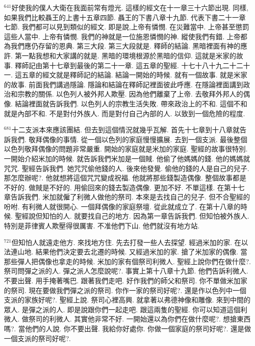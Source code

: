 \documentclass{book}
\begin{document}
$^{641}$好使我的僕人大衛在我面前常有燈光.
這樣的經文在十一章三十六節出現.
同樣,如果我們比較聶王的上書十五章四節.
聶王的下書八章十九節.
代表下書二十一章七節.
我們都可以見到類似的經文.
即是說,上帝有憐憫.
在災難當中.
上帝甚至懲罰這些人當中.
上帝有憐憫.
我們的神就是一位施恩憐憫的神.
縱使我們有錯.
上帝都為我們應仍存留的恩典.
第三大段.
第三大段就是.
釋師的結論.
黑暗裡面有神的應許.
第一點我想和大家講的就是.
黑暗的環境根源於黑暗的信仰.
這就是米家的故事.
釋師記由第十七章到最後的第二十一章.
這五章的聖經.
十七十八十九二十二十一.
這五章的經文就是釋師記的結論.
結論一開始的時候.
就有一個故事.
就是米家的故事.
前面我們講過隱論.
隱論和結論在釋師記裡面彼此呼應.
在隱論裡面講到政治和宗教的關係.
以色列人被外邦人欺壓.
因為他們離棄了上帝.
去敬拜外邦人的偶像.
結論裡面就告訴我們.
以色列人的宗教生活失敗.
帶來政治上的不和.
這個不和就是內部不和.
不是對付外族人.
而是對付自己內部的人.
以致到一個危險的程度.

$^{681}$十二支派本來應該團結.
但去到這個情況就幾乎瓦解.
首先十七章到十八章就告訴我們.
敬拜偶像的事情.
從一個以色列的家庭慢慢擴展.
去到一個支派.
最後整個以色列敬拜偶像的問題非常嚴重.
開始的家庭就是米加的家庭.
聖經的故事很特別.
一開始介紹米加的時候.
就告訴我們米加是一個賊.
他偷了他媽媽的錢.
他的媽媽就咒咒.
聖經告訴我們.
她咒咒偷他錢的人.
後來他發覺.
偷他的錢的人是自己的兒子.
那怎麼辦呢?.
他就想將這個咒咒變成祝福.
他就將那些錢製造偶像.
整個故事都是不好的.
做賊是不好的.
用偷回來的錢去製造偶像.
更加不好.
不單這樣.
在第十七章告訴我們.
米加就僱了利微人做他的祭司.
本來是去找自己的兒子.
但不合聖經的吩咐.
有利微人就很開心.
一個拜偶像的家庭祭壇.
從此就成立了.
在第十八章的時候.
聖經說但知怕的人.
就要找自己的地方.
因為第一章告訴我們.
但知怕被外族人.
特別是菲律賓人欺壓得很厲害.
不准他們下山.
他們就沒有地方站.

$^{721}$但知怕人就遠走他方.
來找地方住.
先去打發一些人去探望.
經過米加的家.
在以法連山地.
結果他們決定要去北遷的時候.
又經過米加的家.
搶了米加家的偶像.
當那些彈人把偶像也拿走的時候.
米加的家有個祭司利微人.
聖經上說你們在做什麼?.
祭司問彈之派的人.
彈之派人怎麼說呢?.
事實上第十八章十九節.
他們告訴利微人.
不要出聲.
用手掩著嘴巴.
跟著我們走吧.
好作我們的師父和祭司.
你不單做米加家的祭司.
現在要做我們彈之派的祭司.
你作一家的祭司好呢?.
還是作以色列中一個支派的家族好呢?.
聖經上說.
祭司心裡高興.
就拿著以弗德神像和雕像.
來到中間的眾人.
是彈之派的人.
即是說跟你們一起走吧.
跟這兩隻的聖經.
你可以知道這個利微人.
做祭司的利微人.
其實他非常不好.
一開始還以為你們在做什麼呢?.
想搶東西嗎?.
當他們的人說.
你不要出聲.
我給你好處你.
你做一個家庭的祭司好呢?.
還是做一個支派的祭司好呢?.
\end{document}
